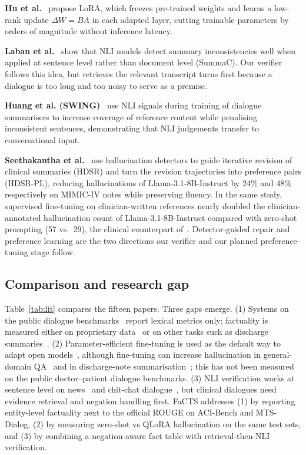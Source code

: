 \documentclass[conference]{IEEEtran}
\begin{document}
\textbf{Hu et al.}~\cite{hu2022lora} propose LoRA, which freezes pre-trained weights and learns a low-rank
update $\Delta W = BA$ in each adapted layer, cutting trainable parameters by orders of magnitude without
inference latency.

\textbf{Laban et al.}~\cite{laban2022summac} show that NLI models detect summary inconsistencies well when
applied at sentence level rather than document level (SummaC). Our verifier follows this idea, but retrieves
the relevant transcript turns first because a dialogue is too long and too noisy to serve as a premise.

\textbf{Huang et al. (SWING)}~\cite{huang2023swing} use NLI signals during training of dialogue summarisers
to increase coverage of reference content while penalising inconsistent sentences, demonstrating that NLI
judgements transfer to conversational input.

\textbf{Seethakantha et al.}~\cite{seethakantha2026hdsr} use hallucination detectors to guide iterative
revision of clinical summaries (HDSR) and turn the revision trajectories into preference pairs (HDSR-PL),
reducing hallucinations of Llama-3.1-8B-Instruct by 24\% and 48\% respectively on MIMIC-IV notes while
preserving fluency. In the same study, supervised fine-tuning on clinician-written references nearly doubled
the clinician-annotated hallucination count of Llama-3.1-8B-Instruct compared with zero-shot prompting
(57 vs.\ 29), the clinical counterpart of~\cite{gekhman2024}. Detector-guided repair and preference learning are the two directions our verifier and
our planned preference-tuning stage follow.

\subsection{Comparison and research gap}
Table~\ref{tab:lit} compares the fifteen papers. Three gaps emerge. (1) Systems on the public dialogue
benchmarks~\cite{abacha2023overview,giorgi2023wanglab,sharma2023cadence,lyu2024} report lexical metrics
only; factuality is measured either on proprietary data~\cite{asgari2025} or on other tasks such as
discharge summaries~\cite{das2025,seethakantha2026hdsr}. (2) Parameter-efficient fine-tuning is used as the
default way to adapt open models~\cite{vanveen2024,lyu2024}, although fine-tuning can increase hallucination
in general-domain QA~\cite{gekhman2024,kaplan2026} and in discharge-note summarisation~\cite{seethakantha2026hdsr};
this has not been measured on the public doctor--patient dialogue benchmarks. (3) NLI verification works at sentence level on news~\cite{laban2022summac} and
chit-chat dialogue~\cite{huang2023swing}, but clinical dialogues need evidence retrieval and negation
handling first. FaCTS addresses (1) by reporting entity-level factuality next to the official ROUGE on
ACI-Bench and MTS-Dialog, (2) by measuring zero-shot vs QLoRA hallucination on the same test sets, and (3) by
combining a negation-aware fact table with retrieval-then-NLI verification.
\end{document}
